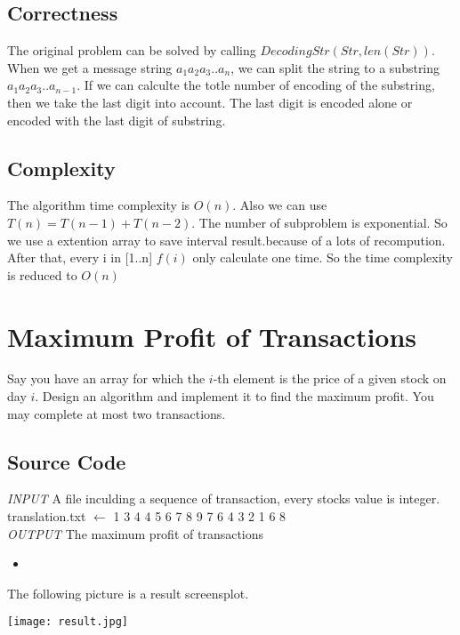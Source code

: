 \documentclass{article}
\newcommand{\pythonscript}[2]{
\begin{itemize}
\item[]
\end{itemize}
}
\numberwithin{equation}{section}
\begin{document}
	\subsection{Correctness}
	The original problem can be solved by calling $DecodingStr(Str, len(Str))$. When we get a message string $a_1a_2a_3..a_n$, we can split the string to a substring $a_1a_2a_3..a_{n-1}$. If
	we can calculte the totle number of encoding of the substring, then we take the last digit into account. The last digit is encoded alone or encoded with the last digit of substring.
	\subsection{Complexity}
	The algorithm time complexity is $O(n)$. Also we can use $T(n) = T(n-1) + T(n-2)$. The number of subproblem is exponential. So we use a extention array to save interval result.because of  a lots of recompution. After that, every i in [1..n] $f(i)$ only calculate one time. So the time complexity is  reduced to $O(n)$

%
%
\section{Maximum Profit of Transactions}
Say you have an array for which the $i$-th element is the price of a given stock on day $i$. Design an algorithm and implement it to find the maximum profit. You may complete at most two transactions.
\subsection{Source Code}
	\emph{INPUT} A file inculding a sequence of transaction, every stocks value is integer.\\
	 translation.txt  $\gets$ 1 3 4 4 5 6 7 8 9 7 6 4 3 2 1 6 8 \\
	\emph{OUTPUT} The maximum profit of transactions
	\pythonscript{maxProfit}{Algorithm for maximum profit of transactions}
	The following picture is a result screensplot.
		\begin{center}
            \texttt{[image: result.jpg]} %
        \end{center}
\end{document}
